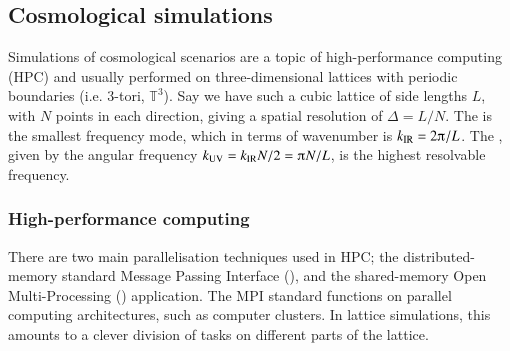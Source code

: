     




\subsection{Cosmological simulations}

    Simulations of cosmological scenarios are a topic of high-performance computing (HPC) and usually performed on three-dimensional lattices with periodic boundaries (i.e.  3-tori, $\mathbb{T}^3$). Say we have such a cubic lattice of side lengths $L$, with $N$ points in each direction, giving a spatial resolution of $\Delta=L/N$. %
    The  is the smallest frequency mode, which in terms of wavenumber is $k\ped{IR}=2\ppi/L$. %
    The , given by the angular frequency $k\ped{UV}=k\ped{IR} N/2 = \ppi N/L$, is the highest resolvable frequency.


    \subsubsection{High-performance computing}

    There are two main parallelisation techniques used in HPC; the distributed-memory standard Message Passing Interface (), and the shared-memory Open Multi-Processing () application. %
    The MPI standard functions on parallel computing architectures, such as computer clusters. In lattice simulations, this amounts to a clever division of tasks on different parts of the lattice.  %


    

    

    
    

